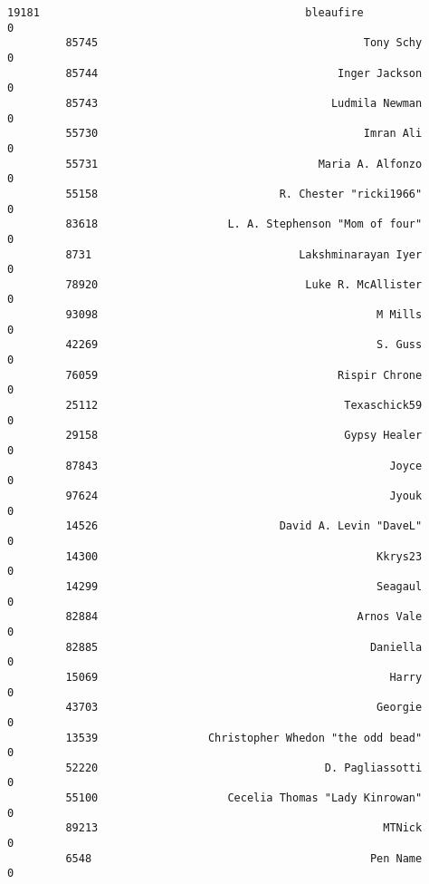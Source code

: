\documentclass[11pt]{article}
\begin{document}
\begin{Verbatim}[commandchars=\\\{\}]
         19181                                         bleaufire                     0   
         85745                                         Tony Schy                     0   
         85744                                     Inger Jackson                     0   
         85743                                    Ludmila Newman                     0   
         55730                                         Imran Ali                     0   
         55731                                  Maria A. Alfonzo                     0   
         55158                            R. Chester "ricki1966"                     0   
         83618                    L. A. Stephenson "Mom of four"                     0   
         8731                                Lakshminarayan Iyer                     0   
         78920                                Luke R. McAllister                     0   
         93098                                           M Mills                     0   
         42269                                           S. Guss                     0   
         76059                                     Rispir Chrone                     0   
         25112                                      Texaschick59                     0   
         29158                                      Gypsy Healer                     0   
         87843                                             Joyce                     0   
         97624                                             Jyouk                     0   
         14526                            David A. Levin "DaveL"                     0   
         14300                                           Kkrys23                     0   
         14299                                           Seagaul                     0   
         82884                                        Arnos Vale                     0   
         82885                                          Daniella                     0   
         15069                                             Harry                     0   
         43703                                           Georgie                     0   
         13539                 Christopher Whedon "the odd bead"                     0   
         52220                                   D. Pagliassotti                     0   
         55100                    Cecelia Thomas "Lady Kinrowan"                     0   
         89213                                            MTNick                     0   
         6548                                           Pen Name                     0   

\end{Verbatim}
\end{document}
